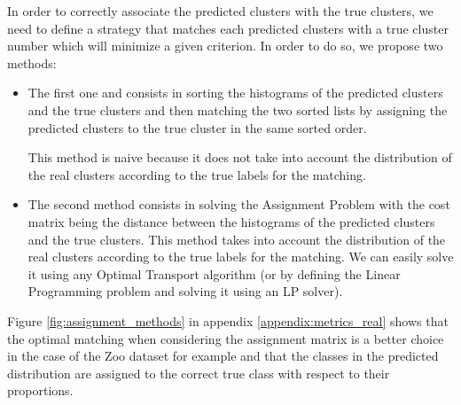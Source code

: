 In order to correctly associate the predicted clusters with the true clusters, we need to define a strategy that matches each predicted clusters with a true cluster number which will minimize a given criterion.
In order to do so, we propose two methods:
\begin{itemize}
    \item The first one and consists in sorting the histograms of the predicted clusters and the true clusters and then matching the two sorted lists by assigning the predicted clusters to the true cluster in the same sorted order.
    
    This method is naive because it does not take into account the distribution of the real clusters according to the true labels for the matching.
    
\item The second method consists in solving the Assignment Problem \citep{kuhn1955hungarian} with the cost matrix being the distance between the histograms of the predicted clusters and the true clusters. This method takes into account the distribution of the real clusters according to the true labels for the matching. We can easily solve it using any Optimal Transport algorithm (or by defining the Linear Programming problem and solving it using an LP solver).
\end{itemize}
Figure \ref{fig:assignment_methods} in appendix \ref{appendix:metrics_real} shows that the optimal matching when considering the assignment matrix is a better choice in the case of the Zoo dataset for example and that the classes in the predicted distribution are assigned to the correct true class with respect to their proportions.


